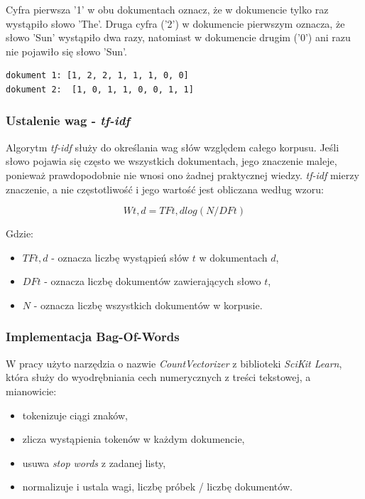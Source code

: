 Cyfra pierwsza '1' w obu dokumentach oznacz, że w dokumencie tylko raz wystąpiło słowo 'The'. Druga cyfra ('2') w dokumencie pierwszym oznacza, że słowo 'Sun' wystąpiło dwa razy, natomiast w dokumencie drugim ('0') ani razu nie pojawiło się słowo 'Sun'.
\begin{lstlisting}[caption=Utworzone wektory, style=someShit]
dokument 1: [1, 2, 2, 1, 1, 1, 0, 0]
dokument 2:  [1, 0, 1, 1, 0, 0, 1, 1]
\end{lstlisting}
\subsubsection*{Ustalenie wag - \textit{tf-idf}}
Algorytm \textit{tf-idf} służy do określania wag słów względem całego korpusu. Jeśli słowo pojawia się często we wszystkich dokumentach, jego znaczenie maleje, ponieważ prawdopodobnie nie wnosi ono żadnej praktycznej wiedzy. \textit{tf-idf} mierzy znaczenie, a nie częstotliwość i jego wartość jest obliczana według wzoru\cite{tfidf-eq}:

\begin{equation}
Wt,d = TFt,d log(N/DFt)
\end{equation}

Gdzie:
\begin{itemize}
\item $TFt,d$ - oznacza liczbę wystąpień słów $t$ w dokumentach $d$,
\item $DFt$ - oznacza liczbę dokumentów zawierających słowo $t$,
\item $N$ - oznacza liczbę wszystkich dokumentów w korpusie.
\end{itemize}

\subsubsection*{Implementacja Bag-Of-Words}
W pracy użyto narzędzia o nazwie \textit{CountVectorizer} z biblioteki \textit{SciKit Learn}, która służy do wyodrębniania cech numerycznych z treści tekstowej, a mianowicie\cite{skl-reference}:
\begin{itemize}
\setlength\itemsep{0.6em}
\item tokenizuje ciągi znaków, 
\item zlicza wystąpienia tokenów w każdym dokumencie,
\item usuwa \textit{stop words} z zadanej listy,
\item normalizuje i ustala wagi, liczbę próbek / liczbę dokumentów.
\end{itemize}

